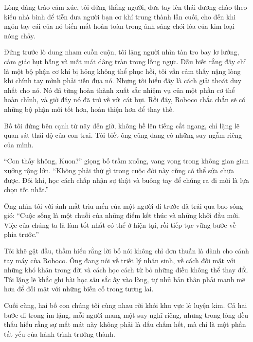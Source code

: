 \documentclass[../main.tex]{subfiles}
\begin{document}
Lòng dâng trào cảm xúc, tôi đứng thẳng người, đưa tay lên thái dương chào theo kiểu nhà binh để tiễn đưa người bạn cơ khí trung thành lần cuối, cho đến khi ngón tay cái của nó biến mất hoàn toàn trong ánh sáng chói lòa của kim loại nóng chảy.

Đứng trước lò dung nham cuồn cuộn, tôi lặng người nhìn tàn tro bay lơ lướng, cảm giác hụt hẫng và mất mát dâng tràn trong lồng ngực. Dẫu biết rằng đây chỉ là một bộ phận cơ khí bị hỏng không thể phục hồi, tôi vẫn cảm thấy nặng lòng khi chính tay mình phải tiễn đưa nó. Nhưng tôi hiểu đây là cách giải thoát duy nhất cho nó. Nó đã từng hoàn thành xuất sắc nhiệm vụ của một phần cơ thể hoàn chỉnh, và giờ đây nó đã trở về với cát bụi. Rồi đây, Roboco chắc chắn sẽ có những bộ phận mới tốt hơn, hoàn thiện hơn để thay thế.

Bố tôi đứng bên cạnh từ nãy đến giờ, không hề lên tiếng cắt ngang, chỉ lặng lẽ quan sát thái độ của con trai. Tôi biết ông cũng đang có những suy ngẫm riêng của mình.

``Con thấy không, Kuon?'' giọng bố trầm xuống, vang vọng trong không gian gian xưởng rộng lớn. ``Không phải thứ gì trong cuộc đời này cũng có thể sửa chữa được. Đôi khi, học cách chấp nhận sự thật và buông tay để chúng ra đi mới là lựa chọn tốt nhất.''

Ông nhìn tôi với ánh mắt trìu mến của một người đi trước đã trải qua bao sóng gió: ``Cuộc sống là một chuỗi của những điểm kết thúc và những khởi đầu mới. Việc của chúng ta là làm tốt nhất có thể ở hiện tại, rồi tiếp tục vững bước về phía trước.''

Tôi khẽ gật đầu, thầm hiểu rằng lời bố nói không chỉ đơn thuần là dành cho cánh tay máy của Roboco. Ông đang nói về triết lý nhân sinh, về cách đối mặt với những khó khăn trong đời và cách học cách từ bỏ những điều không thể thay đổi. Tôi lặng lẽ khắc ghi bài học sâu sắc ấy vào lòng, tự nhủ bản thân phải mạnh mẽ hơn để đối mặt với những biến cố trong tương lai.

Cuối cùng, hai bố con chúng tôi cùng nhau rời khỏi khu vực lò luyện kim. Cả hai bước đi trong im lặng, mỗi người mang một suy nghĩ riêng, nhưng trong lòng đều thấu hiểu rằng sự mất mát này không phải là dấu chấm hết, mà chỉ là một phần tất yếu của hành trình trưởng thành.
\end{document}
